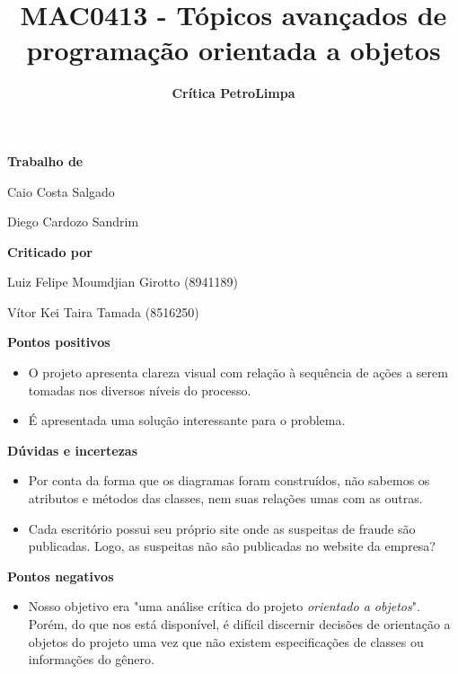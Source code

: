\documentclass{article}
\title{\textbf{MAC0413 - Tópicos avançados de programação orientada a objetos}}
\author{\textbf{Crítica PetroLimpa}}
\date{}
\begin{document}
\maketitle

\begin{center}
\textbf{\large{Trabalho de}}

Caio Costa Salgado

Diego Cardozo Sandrim

\bigskip
\textbf{\large{Criticado por}}

Luiz Felipe Moumdjian Girotto (8941189)

Vítor Kei Taira Tamada (8516250)
\end{center}

\begin{flushleft}
\textbf{\LARGE{Pontos positivos}}

\begin{itemize}

\item O projeto apresenta clareza visual com relação à sequência de ações a serem tomadas nos diversos níveis do processo.

\item É apresentada uma solução interessante para o problema.

\end{itemize}

\bigskip
\bigskip
\textbf{\LARGE{Dúvidas e incertezas}}

\begin{itemize}

\item Por conta da forma que os diagramas foram construídos, não sabemos os atributos e métodos das classes, nem suas relações umas com as outras.

\item Cada escritório possui seu próprio site onde as suspeitas de fraude são publicadas. Logo, as suspeitas não são publicadas no website da empresa?

\end{itemize}

\bigskip
\bigskip
\textbf{\LARGE{Pontos negativos}}

\begin{itemize}

\item Nosso objetivo era "uma análise crítica do projeto \textit{orientado a objetos}". Porém, do que nos está disponível, é difícil discernir decisões de orientação a objetos do projeto uma vez que não existem especificações de classes ou informações do gênero.


\end{itemize}
\end{flushleft}
\end{document}
